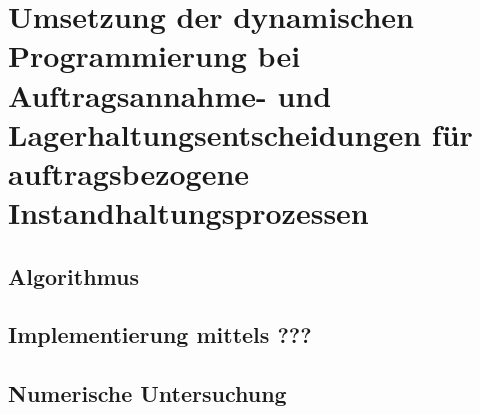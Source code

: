 \chapter{Umsetzung der dynamischen Programmierung bei Auftragsannahme- und Lagerhaltungsentscheidungen für auftragsbezogene Instandhaltungsprozessen}
\setcounter{footnote}{8}

\section{Algorithmus}

\section{Implementierung mittels ???}

\section{Numerische Untersuchung}


